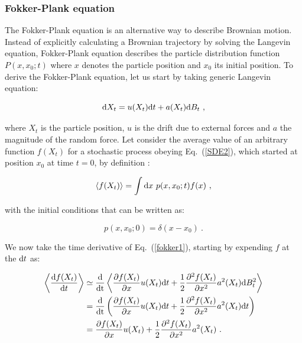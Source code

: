 \subsubsection{Fokker-Plank equation}

The Fokker-Plank equation is an alternative way to describe Brownian motion. Instead of explicitly calculating a Brownian trajectory by solving the Langevin equation, Fokker-Plank equation describes the particle distribution function $P(x, x_0; t)$ where $x$ denotes the particle position and $x_0$ its initial position. To derive the Fokker-Plank equation, let us start by taking generic Langevin equation:

\begin{equation}
	\textnormal{d}X_t = u(X_t) \textnormal{d}t + a(X_t)\textnormal{d}B_t ~,
	\label{SDE2}
\end{equation}

where $X_t$ is the particle position,  $u$ is the drift due to external forces and $a$ the magnitude of the random force. Let consider the average value of an arbitrary function $f(X_t)$ for a stochastic process obeying Eq.~(\ref{SDE2}), which started at position $x_0$ at time $t=0$, by definition \cite{le_bellac_equilibrium_2004}:

\begin{equation}
	\langle f(X_t) \rangle = \int \textnormal{d}x ~ p(x, x_0 ; t) f(x) ~,
	\label{fokker1}
\end{equation}

with the initial conditions that can be written as:

\begin{equation}
	p(x, x_0; 0) = \delta (x - x_0) ~.
\end{equation}

We now take the time derivative of Eq.~(\ref{fokker1}), starting by expending $ f$ at the $\textnormal{d}t$ as:

\begin{equation}
	\begin{aligned}
		\left\langle \frac{\textnormal{d}f(X_t)}{\textnormal{d}t} \right\rangle  &\simeq \frac{\textnormal{d}}{\textnormal{dt}}\left\langle   \frac{\partial f(X_t)}{\partial x} u(X_t) \textnormal{d}t + \frac{1}{2} \frac{\partial^2 f(X_t)}{\partial x^2} a^2 (X_t) \textnormal{d}B_t^2   \right\rangle \\
		& =  \frac{\textnormal{d}}{\textnormal{dt}} \left( \frac{\partial f(X_t)}{\partial x} u(X_t) \textnormal{d}t + \frac{1}{2} \frac{\partial^2 f(X_t)}{\partial x^2} a^2 (X_t) \textnormal{d}t \right) \\
		& = \frac{\partial f(X_t)}{\partial x} u(X_t) + \frac{1}{2} \frac{\partial^2 f(X_t)}{\partial x^2} a^2 (X_t) ~.
	\end{aligned}
	\label{fokker2}
\end{equation}


